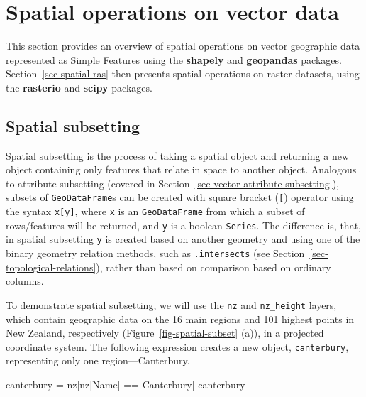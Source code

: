 \documentclass[
  letterpaper,
]{krantz}
\newenvironment{Shaded}{\begin{snugshade}}{\end{snugshade}}
\newcommand{\NormalTok}[1]{\textcolor[rgb]{0.00,0.23,0.31}{#1}}
\newcommand{\OperatorTok}[1]{\textcolor[rgb]{0.37,0.37,0.37}{#1}}
\newcommand{\StringTok}[1]{\textcolor[rgb]{0.13,0.47,0.30}{#1}}
\begin{document}
\section{Spatial operations on vector data}\label{sec-spatial-vec}

This section provides an overview of spatial operations on vector
geographic data represented as Simple Features using the
\textbf{shapely} and \textbf{geopandas} packages.
Section~\ref{sec-spatial-ras} then presents spatial operations on raster
datasets, using the \textbf{rasterio} and \textbf{scipy} packages.

\subsection{Spatial subsetting}\label{sec-spatial-subsetting-vector}

Spatial subsetting is the process of taking a spatial object and
returning a new object containing only features that relate in space to
another object. Analogous to attribute subsetting (covered in
Section~\ref{sec-vector-attribute-subsetting}), subsets of
\texttt{GeoDataFrame}s can be created with square bracket (\texttt{{[}})
operator using the syntax \texttt{x{[}y{]}}, where \texttt{x} is an
\texttt{GeoDataFrame} from which a subset of rows/features will be
returned, and \texttt{y} is a boolean \texttt{Series}. The difference
is, that, in spatial subsetting \texttt{y} is created based on another
geometry and using one of the binary geometry relation methods, such as
\texttt{.intersects} (see Section~\ref{sec-topological-relations}),
rather than based on comparison based on ordinary columns.

To demonstrate spatial subsetting, we will use the \texttt{nz} and
\texttt{nz\_height} layers, which contain geographic data on the 16 main
regions and 101 highest points in New Zealand, respectively
(Figure~\ref{fig-spatial-subset} (a)), in a projected coordinate system.
The following expression creates a new object, \texttt{canterbury},
representing only one region---Canterbury.

\begin{Shaded}
\begin{Highlighting}[]
\NormalTok{canterbury }\OperatorTok{=}\NormalTok{ nz[nz[}\StringTok{\textquotesingle{}Name\textquotesingle{}}\NormalTok{] }\OperatorTok{==} \StringTok{\textquotesingle{}Canterbury\textquotesingle{}}\NormalTok{]}
\NormalTok{canterbury}
\end{Highlighting}
\end{Shaded}
\end{document}
